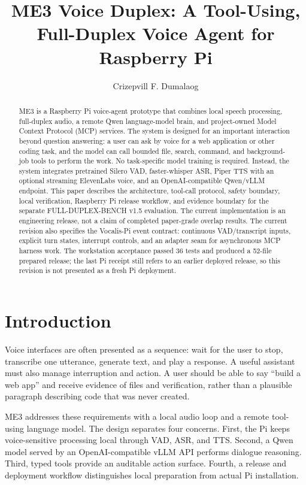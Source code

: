 \documentclass[sigconf,nonacm]{acmart}
\title{ME3 Voice Duplex: A Tool-Using, Full-Duplex Voice Agent for Raspberry Pi}
\author{Crizepvill F. Dumalaog}
\affiliation{\institution{Mapua University}\department{Master of Engineering in Artificial Intelligence}\city{Manila}\country{Philippines}}
\begin{document}
\begin{abstract}
ME3 is a Raspberry Pi voice-agent prototype that combines local speech processing,
full-duplex audio, a remote Qwen language-model brain, and project-owned Model
Context Protocol (MCP) services. The system is designed for an important
interaction beyond question answering: a user can ask by voice for a web
application or other coding task, and the model can call bounded file, search,
command, and background-job tools to perform the work. No task-specific model
training is required. Instead, the system integrates pretrained Silero VAD,
faster-whisper ASR, Piper TTS with an optional streaming ElevenLabs voice, and
an OpenAI-compatible Qwen/vLLM endpoint.
This paper describes the architecture, tool-call protocol, safety boundary,
local verification, Raspberry Pi release workflow, and evidence boundary for
the separate FULL-DUPLEX-BENCH v1.5 evaluation. The current implementation is
an engineering release, not a claim of completed paper-grade overlap results.
The current revision also specifies the Vocalis-Pi event contract: continuous
VAD/transcript inputs, explicit turn states, interrupt controls, and an
adapter seam for asynchronous MCP harness work. The workstation acceptance
passed 36 tests and produced a 52-file prepared release; the last Pi receipt
still refers to an earlier deployed release, so this revision is not presented
as a fresh Pi deployment.
\end{abstract}


\maketitle

\section{Introduction}

Voice interfaces are often presented as a sequence: wait for the user to stop,
transcribe one utterance, generate text, and play a response. A useful
assistant must also manage interruption and action. A user should be able to
say ``build a web app'' and receive evidence of files and verification, rather
than a plausible paragraph describing code that was never created.

ME3 addresses these requirements with a local audio loop and a remote tool-using
language model. The design separates four concerns. First, the Pi keeps
voice-sensitive processing local through VAD, ASR, and TTS. Second, a Qwen
model served by an OpenAI-compatible vLLM API performs dialogue reasoning.
Third, typed tools provide an auditable action surface. Fourth, a release and
deployment workflow distinguishes local preparation from actual Pi installation.
\end{document}

